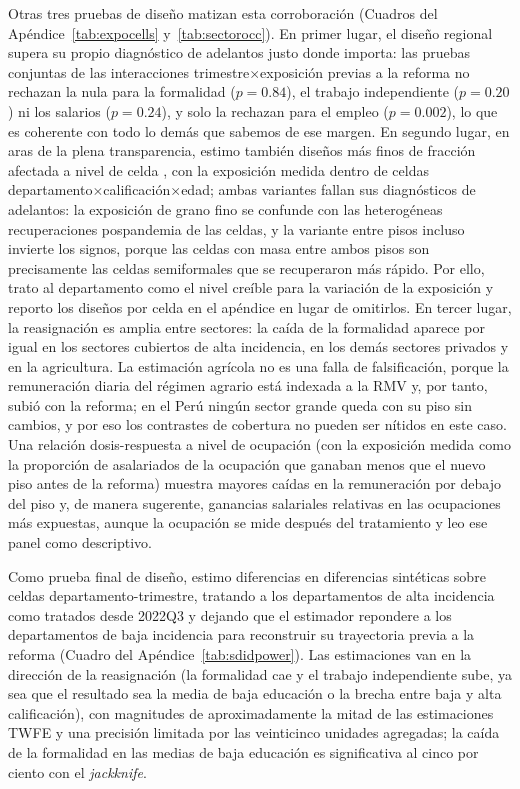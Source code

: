 Otras tres pruebas de diseño matizan esta corroboración (Cuadros del Apéndice~\ref{tab:expocells} y~\ref{tab:sectorocc}). En primer lugar, el diseño regional supera su propio diagnóstico de adelantos justo donde importa: las pruebas conjuntas de las interacciones trimestre$\times$exposición previas a la reforma no rechazan la nula para la formalidad ($p=0.84$), el trabajo independiente ($p=0.20$) ni los salarios ($p=0.24$), y solo la rechazan para el empleo ($p=0.002$), lo que es coherente con todo lo demás que sabemos de ese margen. En segundo lugar, en aras de la plena transparencia, estimo también diseños más finos de fracción afectada a nivel de celda \citep{card_1992, clemens_wither_2019}, con la exposición medida dentro de celdas departamento$\times$calificación$\times$edad; ambas variantes fallan sus diagnósticos de adelantos: la exposición de grano fino se confunde con las heterogéneas recuperaciones pospandemia de las celdas, y la variante entre pisos incluso invierte los signos, porque las celdas con masa entre ambos pisos son precisamente las celdas semiformales que se recuperaron más rápido. Por ello, trato al departamento como el nivel creíble para la variación de la exposición y reporto los diseños por celda en el apéndice en lugar de omitirlos. En tercer lugar, la reasignación es amplia entre sectores: la caída de la formalidad aparece por igual en los sectores cubiertos de alta incidencia, en los demás sectores privados y en la agricultura. La estimación agrícola no es una falla de falsificación, porque la remuneración diaria del régimen agrario está indexada a la RMV y, por tanto, subió con la reforma; en el Perú ningún sector grande queda con su piso sin cambios, y por eso los contrastes de cobertura no pueden ser nítidos en este caso. Una relación dosis-respuesta a nivel de ocupación (con la exposición medida como la proporción de asalariados de la ocupación que ganaban menos que el nuevo piso antes de la reforma) muestra mayores caídas en la remuneración por debajo del piso y, de manera sugerente, ganancias salariales relativas en las ocupaciones más expuestas, aunque la ocupación se mide después del tratamiento y leo ese panel como descriptivo.

Como prueba final de diseño, estimo diferencias en diferencias sintéticas \citep{arkhangelsky_2021_sdid} sobre celdas departamento-trimestre, tratando a los departamentos de alta incidencia como tratados desde 2022Q3 y dejando que el estimador repondere a los departamentos de baja incidencia para reconstruir su trayectoria previa a la reforma (Cuadro del Apéndice~\ref{tab:sdidpower}). Las estimaciones van en la dirección de la reasignación (la formalidad cae y el trabajo independiente sube, ya sea que el resultado sea la media de baja educación o la brecha entre baja y alta calificación), con magnitudes de aproximadamente la mitad de las estimaciones TWFE y una precisión limitada por las veinticinco unidades agregadas; la caída de la formalidad en las medias de baja educación es significativa al cinco por ciento con el \emph{jackknife}.

